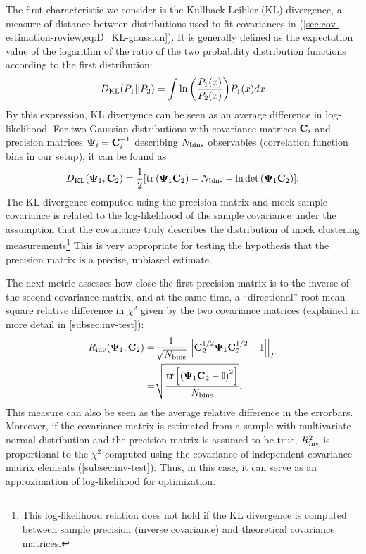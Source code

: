 The first characteristic we consider is the Kullback-Leibler (KL) divergence, a measure of distance between distributions used to fit covariances in \rascalc{} (\cref{sec:cov-estimation-review,eq:D_KL-gaussian}).
It is generally defined as the expectation value of the logarithm of the ratio of the two probability distribution functions according to the first distribution:
\begin{equation} \label{eq:D_KL-definition}
D_{\rm KL} (P_1 || P_2) = \int \ln {\left( \frac{P_1(x)}{P_2(x)} \right)} P_1(x) dx
\end{equation}
By this expression, KL divergence can be seen as an average difference in log-likelihood.
For two Gaussian distributions with covariance matrices ${\bf C}_i$ and precision matrices ${\bf \Psi}_i={\bf C}_i^{-1}$ describing $N_{\rm bins}$ observables (correlation function bins in our setup), it can be found as
\begin{equation} \label{eq:D_KL-gaussian}
D_{\rm KL} \Arg{{\bf \Psi}_1, {\bf C}_2} = \frac12 \Args{\tr \Arg{{\bf \Psi}_1 {\bf C}_2} - N_{\rm bins} - \ln \det \Arg{{\bf \Psi}_1 {\bf C}_2}}.
\end{equation}
The KL divergence computed using the \rascalc{} precision matrix and mock sample covariance is related to the log-likelihood of the sample covariance under the assumption that the \rascalc{} covariance truly describes the distribution of mock clustering measurements\footnote{This log-likelihood relation does not hold if the KL divergence is computed between sample precision (inverse covariance) and theoretical covariance matrices.} \citep{rascal}
This is very appropriate for testing the hypothesis that the \rascalc{} precision matrix is a precise, unbiased estimate.

The next metric assesses how close the first precision matrix is to the inverse of the second covariance matrix, and at the same time, a ``directional'' root-mean-square relative difference in $\chi^2$ given by the two covariance matrices (explained in more detail in \cref{subsec:inv-test}):
\begin{align} \label{eq:R_inv-definition}
R_{\rm inv} \Arg{{\bf \Psi}_1, {\bf C}_2} =& \frac1{\sqrt{N_{\rm bins}}} \Abs{\Abs{{\bf C}_2^{1/2} {\bf \Psi}_1 {\bf C}_2^{1/2} - {\bf \mathbb I}}}_F \nonumber \\
=& \sqrt{\frac{\tr \Args{\Arg{{\bf \Psi}_1 {\bf C}_2 - {\bf \mathbb I}}^2}}{N_{\rm bins}}}.
\end{align}
This measure can also be seen as the average relative difference in the errorbars.
Moreover, if the covariance matrix is estimated from a sample with multivariate normal distribution and the precision matrix is assumed to be true, $R_{\rm inv}^2$ is proportional to the $\chi^2$ computed using the covariance of independent covariance matrix elements (\cref{subsec:inv-test}).
Thus, in this case, it can serve as an approximation of log-likelihood for optimization.

